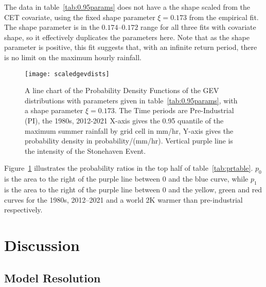 The data in table~\ref{tab:0.95params} does not have a the shape scaled from the CET covariate,
    using the fixed shape parameter $\xi = 0.173$ from the empirical fit.
The shape parameter is in the $0.174$--$0.172$ range for all three fits with covariate shape,
    so it effectively duplicates the parameters here.
Note that as the shape parameter is positive,
    this fit suggests that, with an infinite return period, there is no limit on the maximum hourly rainfall.

\begin{figure}[H] %
    \centering
    \texttt{[image: scaledgevdists]}
    \caption{A line chart of the Probability Density Functions of the GEV distributions with parameters given in table~\ref{tab:0.95params},
        with a shape parameter $\xi = 0.173$.
    The Time periods are Pre-Industrial (PI), the 1980s, 2012-2021
    X-axis gives the 0.95 quantile of the maximum summer rainfall by grid cell in mm/hr,
        Y-axis gives the probability density in probability/(mm/hr).
    Vertical purple line is the intensity of the Stonehaven Event.}
    \label{fig:scaledgevdists}
\end{figure}

Figure~\ref{fig:scaledgevdists} illustrates the probability ratios in the top half of table~\ref{tab:prtable}.
$p_0$ is the area to the right of the purple line between 0 and the blue curve,
    while $p_1$ is the area to the right of the purple line between 0 and the yellow, green and red curves for
    the 1980s, 2012--2021 and a world 2K warmer than pre-industrial respectively.


\section{Discussion}\label{sec:discussion}

\begin{comment}
This section should give a picture of what you have taken out of your
project and how you can put it into context.

This section should summarise the results obtained, detail conclusions
reached, suggest future work, and changes that you would make if you
repeated the project.
\end{comment}

\subsection{Model Resolution}\label{subsec:dismodeldef}

